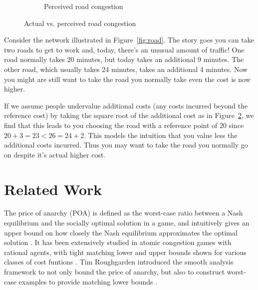 \documentclass[twoside]{article}
\begin{document}
\begin{multicols}{2}
\begin{figure}[H]
  \begin{subfigure}[b]{\linewidth}
    \centering
    \caption{Perceived road congestion}
    \label{fig:roadbet}
  \end{subfigure}
  \caption{Actual vs. perceived road congestion}
\end{figure}

Consider the network illustrated in Figure~\ref{fig:road}.  The story goes you can take two roads to get to work and, today, there's an unusual amount of traffic! One road normally takes 20 minutes, but today takes an additional 9 minutes. The other road, which usually takes 24 minutes, takes an additional 4 minutes. Now you might are still want to take the road you normally take even the cost is now higher.

If we assume people undervalue additional costs (any costs incurred beyond the reference cost) by taking the square root of the additional cost as in Figure~\ref{fig:roadbet}, we find that this leads to you choosing the road with a reference point of 20 since $20 + 3 = 23 < 26 = 24 + 2$.  This models the intuition that you value less the additional costs incurred.  Thus you may want to take the road you normally go on despite it's actual higher cost.

\section{Related Work}
The price of anarchy (POA) is defined as the worst-case ratio between a Nash
equilibrium and the socially optimal solution in a game, and intuitively gives
an upper bound on how closely the Nash equilibrium approximates the optimal
solution \cite{Koutsoupias2009}. It has been extensively studied in atomic
congestion games with rational agents, with tight matching lower and upper
bounds shown for various classes of cost funtions
\cite{Aland2011,Roughgarden2012}. Tim Roughgarden introduced the smooth analysis
framework to not only bound the price of anarchy, but also to construct
worst-case examples to provide matching lower bounds \cite{Roughgarden2012}.


\end{multicols}
\end{document}
